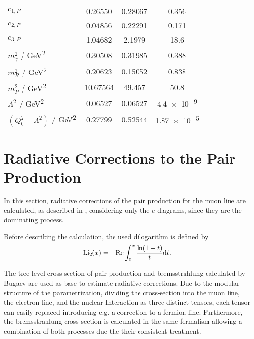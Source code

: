\begin{table}
\begin{center}
\begin{tabular}{l | S[table-format=+2.5] S[table-format=+2.5] S[table-format=+2.4]}
        $c_{1,P}$ & 0.26550 & 0.28067 & 0.356 \\
        $c_{2,P}$ & 0.04856 & 0.22291 & 0.171 \\
        $c_{3,P}$ & 1.04682 & 2.1979 & 18.6 \\
        \midrule
        $m_\gamma^2$ / \si{GeV^2} & 0.30508 & 0.31985 & 0.388 \\
        $m_R^2$ / \si{GeV^2} & 0.20623 & 0.15052 & 0.838 \\
        $m_P^2$ / \si{GeV^2} & 10.67564 & 49.457 & 50.8 \\
        $\Lambda^2$ / \si{GeV^2} & 0.06527 & 0.06527 & {\num{4.4e-9}} \\
        $(Q_0^2 - \Lambda^2)$ / \si{GeV^2} & 0.27799 & 0.52544 & {\num{1.87e-5}} \\
        \bottomrule
    \end{tabular}
    \end{center}
\end{table}


\section{Radiative Corrections to the Pair Production} \label{sec:epair_nlo_calc}

In this section, radiative corrections of the pair production for the muon line are calculated, as described in , considering only the $e$-diagrams, since they are the dominating process.

Before describing the calculation, the used dilogarithm is defined by
\begin{align} \label{eq:dilog}
    \operatorname{Li_2}(x) = - \mathrm{Re} \int_{0}^{x} \frac{\operatorname{ln}(1 - t)}{t} \mathrm{d} t .
\end{align}

The tree-level cross-section of pair production and bremsstrahlung calculated by Bugaev \cite{Bugaev77} are used as base to estimate radiative corrections.
Due to the modular structure of the parametrization, dividing the cross-section into the muon line, the electron line, and the nuclear Interaction as three distinct tensors, each tensor can easily replaced introducing e.g. a correction to a fermion line.
Furthermore, the bremsstrahlung cross-section is calculated in the same formalism allowing a combination of both processes due the their consistent treatment.

